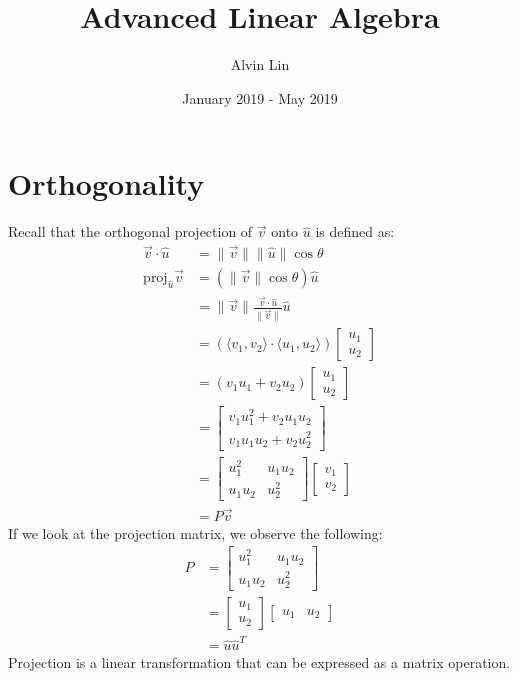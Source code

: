 \documentclass{math}
\title{Advanced Linear Algebra}
\author{Alvin Lin}
\date{January 2019 - May 2019}
\begin{document}
\maketitle

\section*{Orthogonality}
Recall that the orthogonal projection of \( \vec{v} \) onto \( \hat{u} \) is
defined as:
\begin{align*}
  \vec{v}\cdot\hat{u} &= \|\vec{v}\|\|\hat{u}\|\cos\theta \\
  \text{proj}_{\hat{u}}\vec{v} &= (\|\vec{v}\|\cos\theta)\hat{u} \\
  &= \|\vec{v}\|\frac{\vec{v}\cdot\hat{u}}{\|\vec{v}\|}\hat{u} \\
  &= (\langle v_1,v_2\rangle\cdot\langle u_1,u_2\rangle)\begin{bmatrix}
    u_1 \\ u_2
  \end{bmatrix} \\
  &= (v_1u_1+v_2u_2)\begin{bmatrix}
    u_1 \\ u_2
  \end{bmatrix} \\
  &= \begin{bmatrix}
    v_1u_1^2+v_2u_1u_2 \\
    v_1u_1u_2+v_2u_2^2
  \end{bmatrix} \\
  &= \begin{bmatrix}
    u_1^2 & u_1u_2 \\
    u_1u_2 & u_2^2
  \end{bmatrix}\begin{bmatrix}
    v_1 \\ v_2
  \end{bmatrix} \\
  &= P\vec{v}
\end{align*}
If we look at the projection matrix, we observe the following:
\begin{align*}
  P &= \begin{bmatrix}
    u_1^2 & u_1u_2 \\
    u_1u_2 & u_2^2
  \end{bmatrix} \\
  &= \begin{bmatrix}u_1 \\ u_2\end{bmatrix}
    \begin{bmatrix}u_1 & u_2\end{bmatrix} \\
  &= \hat{u}\hat{u}^T
\end{align*}
Projection is a linear transformation that can be expressed as a matrix
operation.
\end{document}
